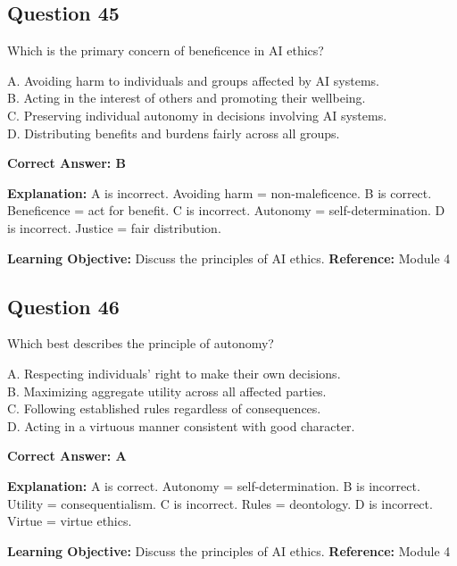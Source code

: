 \documentclass[11pt]{article}
\begin{document}
	\subsection*{Question 45}
	Which is the primary concern of beneficence in AI ethics?
	
	A. Avoiding harm to individuals and groups affected by AI systems.\\
	B. Acting in the interest of others and promoting their wellbeing.\\
	C. Preserving individual autonomy in decisions involving AI systems.\\
	D. Distributing benefits and burdens fairly across all groups.
	
	\vspace{0.4em}
	\textbf{Correct Answer: B}
	
	\textbf{Explanation:}
	A is incorrect. Avoiding harm = non-maleficence.
	B is correct. Beneficence = act for benefit.
	C is incorrect. Autonomy = self-determination.
	D is incorrect. Justice = fair distribution.
	
	\textbf{Learning Objective:} Discuss the principles of AI ethics.
	\textbf{Reference:} Module 4
	
	\subsection*{Question 46}
	Which best describes the principle of autonomy?
	
	A. Respecting individuals' right to make their own decisions.\\
	B. Maximizing aggregate utility across all affected parties.\\
	C. Following established rules regardless of consequences.\\
	D. Acting in a virtuous manner consistent with good character.
	
	\vspace{0.4em}
	\textbf{Correct Answer: A}
	
	\textbf{Explanation:}
	A is correct. Autonomy = self-determination.
	B is incorrect. Utility = consequentialism.
	C is incorrect. Rules = deontology.
	D is incorrect. Virtue = virtue ethics.
	
	\textbf{Learning Objective:} Discuss the principles of AI ethics.
	\textbf{Reference:} Module 4
	
\end{document}
